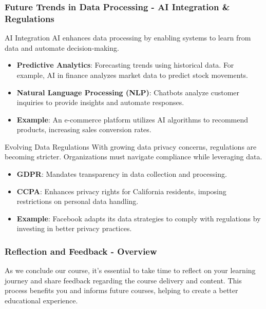 \documentclass{beamer}
\begin{document}
\begin{frame}[fragile]
    \frametitle{Future Trends in Data Processing - AI Integration \& Regulations}
    \begin{block}{AI Integration}
        AI enhances data processing by enabling systems to learn from data and automate decision-making.
    \end{block}

    \begin{itemize}
        \item \textbf{Predictive Analytics}: Forecasting trends using historical data. For example, AI in finance analyzes market data to predict stock movements.
        \item \textbf{Natural Language Processing (NLP)}: Chatbots analyze customer inquiries to provide insights and automate responses.
        \item \textbf{Example}: An e-commerce platform utilizes AI algorithms to recommend products, increasing sales conversion rates.
    \end{itemize}

    \begin{block}{Evolving Data Regulations}
        With growing data privacy concerns, regulations are becoming stricter. Organizations must navigate compliance while leveraging data.
    \end{block}
    
    \begin{itemize}
        \item \textbf{GDPR}: Mandates transparency in data collection and processing.
        \item \textbf{CCPA}: Enhances privacy rights for California residents, imposing restrictions on personal data handling.
        \item \textbf{Example}: Facebook adapts its data strategies to comply with regulations by investing in better privacy practices.
    \end{itemize}
\end{frame}

\begin{frame}[fragile]
    \frametitle{Reflection and Feedback - Overview}
    As we conclude our course, it’s essential to take time to reflect on your learning journey and share feedback regarding the course delivery and content. This process benefits you and informs future courses, helping to create a better educational experience.
\end{frame}
\end{document}
